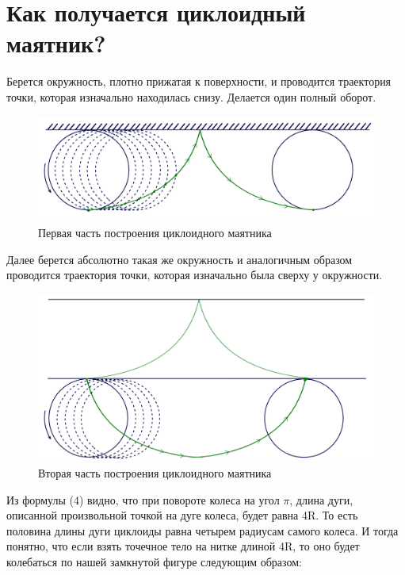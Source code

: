 \documentclass[a4paper, 10pt, twocolumn]{article}
\begin{document}
\section*{Как получается циклоидный маятник?}
    Берется окружность, плотно прижатая к поверхности, и проводится траектория точки, которая изначально
    находилась снизу. Делается один полный оборот. \\
    \begin{figure}[H]
        \centering
        \includegraphics[width=1\linewidth]{traectory1.png}
        \caption{Первая часть построения циклоидного маятника}
    \end{figure}
    Далее берется абсолютно такая же окружность и аналогичным образом проводится траектория точки, которая
    изначально была сверху у окружности.
    \begin{figure}[H]
        \centering
        \includegraphics[width=1\linewidth]{traectory2.png}
        \caption{Вторая часть построения циклоидного маятника}
    \end{figure}
    Из формулы (4) видно, что при повороте колеса на угол  $\pi$, длина дуги, описанной произвольной
     точкой на дуге колеса, будет равна 4R. То есть половина длины дуги циклоиды равна четырем радиусам
     самого колеса. И тогда понятно, что если взять точечное тело на нитке длиной 4R, то оно будет 
     колебаться по нашей замкнутой фигуре следующим образом:
\end{document}
